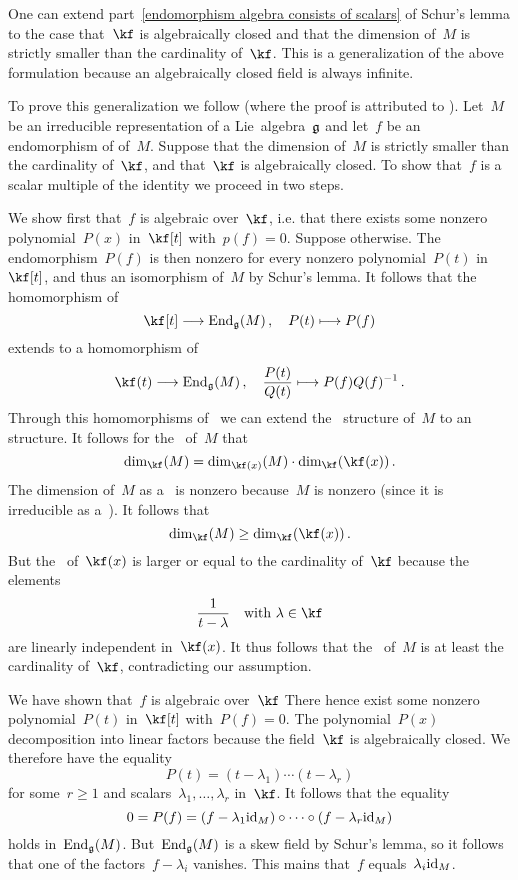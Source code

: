 \begin{remark}
	One can extend part~\ref{endomorphism algebra consists of scalars} of Schur’s lemma to the case that~$\kf$ is algebraically closed and that the dimension of~$M$ is strictly smaller than the cardinality of~$\kf$.
	This is a generalization of the above formulation because an algebraically closed field is always infinite.

	To prove this generalization we follow \cite{quillen_endomorphism_simple_module_enveloping_algebra} (where the proof is attributed to \cite{diximier_representations_lie_nilpotent}).
	Let~$M$ be an irreducible representation of a Lie~algebra~$\glie$ and let~$f$ be an endomorphism of of~$M$.
	Suppose that the dimension of~$M$ is strictly smaller than the cardinality of~$\kf$, and that~$\kf$ is algebraically closed.
	To show that~$f$ is a scalar multiple of the identity we proceed in two steps.

	We show first that~$f$ is algebraic over~$\kf$, i.e. that there exists some nonzero polynomial~$P(x)$ in~$\kf[t]$ with~$p(f) = 0$.
	Suppose otherwise.
	The endomorphism~$P(f)$ is then nonzero for every nonzero polynomial~$P(t)$ in~$\kf[t]$, and thus an isomorphism of~$M$ by Schur’s lemma.
	It follows that the homomorphism of~\algebras{$\kf$}
	\[
		\kf[t]
		\to
		\End_{\glie}(M) \,,
		\quad
		P(t)
		\mapsto
		P(f)
	\]
	extends to a homomorphism of~\algebras{$\kf$}
	\[
		\kf(t)
		\to
		\End_{\glie}(M) \,,
		\quad
		\frac{P(t)}{Q(t)}
		\mapsto
		P(f) Q(f)^{-1} \,.
	\]
	Through this homomorphisms of~\algebras{$\kf$} we can extend the~\vectorspace{$\kf$} structure of~$M$ to an~ structure.
	It follows for the~\dimension{$\kf$} of~$M$ that
	\[
		\dim_{\kf}(M)
		=
		\dim_{\kf(x)}(M) \cdot \dim_{\kf}(\kf(x)) \,.
	\]
	The dimension of~$M$ as a~ is nonzero because~$M$ is nonzero (since it is irreducible as a~\representation{$\glie$}).
	It follows that
	\[
		\dim_{\kf}(M)
		\geq
		\dim_{\kf}(\kf(x)) \,.
	\]
	But the~\dimension{$\kf$} of~$\kf(x)$ is larger or equal to the cardinality of~$\kf$ because the elements
	\[
		\frac{1}{t - \lambda}
		\quad
		\text{with~$\lambda \in \kf$}
	\]
	are linearly independent in~$\kf(x)$.
	It thus follows that the~\dimension{$\kf$} of~$M$ is at least the cardinality of~$\kf$, contradicting our assumption.

	We have shown that~$f$ is algebraic over~$\kf$
	There hence exist some nonzero polynomial~$P(t)$ in~$\kf[t]$ with~$P(f) = 0$.
	The polynomial~$P(x)$ decomposition into linear factors because the field~$\kf$ is algebraically closed.
	We therefore have the equality
	\[
		P(t) = (t - \lambda_1) \dotsm (t - \lambda_r)
	\]
	for some~$r \geq 1$ and scalars~$\lambda_1, \dotsc, \lambda_r$ in~$\kf$.
	It follows that the equality
	\[
		0
		=
		P(f)
		=
		(f - \lambda_1 \mathrm{id}_M) \circ \dotsb \circ (f - \lambda_r \mathrm{id}_M)
	\]
	holds in~$\operatorname{End}_{\mathfrak{g}}(M)$.
	But~$\operatorname{End}_{\mathfrak{g}}(M)$ is a skew field by Schur’s lemma, so it follows that one of the factors~$f - \lambda_i$ vanishes.
	This mains that~$f$ equals~$\lambda_i \mathrm{id}_M$.
\end{remark}





